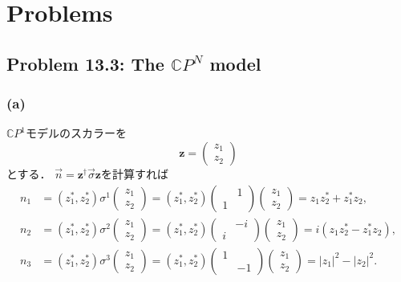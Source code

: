 \section*{Problems}
\subsection{Problem 13.3: The $\mathbb{C}P^N$ model}
\subsubsection{(a)}
$\mathbb{C}P^1$モデルのスカラーを
\[
\boldsymbol{z} = \begin{pmatrix}
z_1 \\ z_2
\end{pmatrix}
\]
とする．
$\vec{n} = \boldsymbol{z}^\dagger \vec\sigma \boldsymbol{z}$を計算すれば
\begin{align*}
  n_1 &= (z_1^*, z_2^*) \sigma^1
  \begin{pmatrix}
    z_1 \\ z_2
  \end{pmatrix}
  = (z_1^*, z_2^*)
  \begin{pmatrix}
    & 1 \\
    1 &
  \end{pmatrix}
  \begin{pmatrix}
    z_1 \\ z_2
  \end{pmatrix}
  = z_1 z_2^* + z_1^* z_2 , \\
  n_2 &= (z_1^*, z_2^*) \sigma^2
  \begin{pmatrix}
    z_1 \\ z_2
  \end{pmatrix}
  = (z_1^*, z_2^*)
  \begin{pmatrix}
    & -i \\
    i &
  \end{pmatrix}
  \begin{pmatrix}
    z_1 \\ z_2
  \end{pmatrix}
  = i (z_1 z_2^* - z_1^* z_2) , \\
  n_3 &= (z_1^*, z_2^*) \sigma^3
  \begin{pmatrix}
    z_1 \\ z_2
  \end{pmatrix}
  = (z_1^*, z_2^*)
  \begin{pmatrix}
    1 & \\
    & -1
  \end{pmatrix}
  \begin{pmatrix}
    z_1 \\ z_2
  \end{pmatrix}
  = \lvert z_1 \rvert^2 - \lvert z_2 \rvert^2 .
\end{align*}
